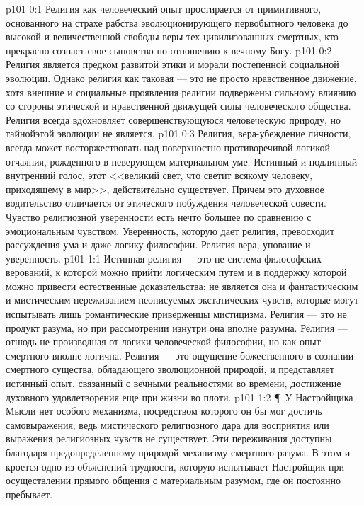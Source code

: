 \vs p101 0:1 Религия как человеческий опыт простирается от примитивного, основанного на страхе рабства эволюционирующего первобытного человека до высокой и величественной свободы веры тех цивилизованных смертных, кто прекрасно сознает свое сыновство по отношению к вечному Богу.
\vs p101 0:2 Религия является предком развитой этики и морали постепенной социальной эволюции. Однако религия как таковая --- это не просто нравственное движение, хотя внешние и социальные проявления религии подвержены сильному влиянию со стороны этической и нравственной движущей силы человеческого общества. Религия всегда вдохновляет совершенствующуюся человеческую природу, но тайнойэтой эволюции не является.
\vs p101 0:3 Религия, вера\hyp{}убеждение личности, всегда может восторжествовать над поверхностно противоречивой логикой отчаяния, рожденного в неверующем материальном уме. Истинный и подлинный внутренний голос, этот <<великий свет, что светит всякому человеку, приходящему в мир>>, действительно существует. Причем это духовное водительство отличается от этического побуждения человеческой совести. Чувство религиозной уверенности есть нечто большее по сравнению с эмоциональным чувством. Уверенность, которую дает религия, превосходит рассуждения ума и даже логику философии. Религия  вера, упование и уверенность.
\vs p101 1:1 Истинная религия --- это не система философских верований, к которой можно прийти логическим путем и в поддержку которой можно привести естественные доказательства; не является она и фантастическим и мистическим переживанием неописуемых экстатических чувств, которые могут испытывать лишь романтические приверженцы мистицизма. Религия --- это не продукт разума, но при рассмотрении изнутри она вполне разумна. Религия --- отнюдь не производная от логики человеческой философии, но как опыт смертного вполне логична. Религия --- это ощущение божественного в сознании смертного существа, обладающего эволюционной природой, и представляет истинный опыт, связанный с вечными реальностями во времени, достижение духовного удовлетворения еще при жизни во плоти.
\vs p101 1:2 \P\ У Настройщика Мысли нет особого механизма, посредством которого он бы мог достичь самовыражения; ведь мистического религиозного дара для восприятия или выражения религиозных чувств не существует. Эти переживания доступны благодаря предопределенному природой механизму смертного разума. В этом и кроется одно из объяснений трудности, которую испытывает Настройщик при осуществлении прямого общения с материальным разумом, где он постоянно пребывает.
